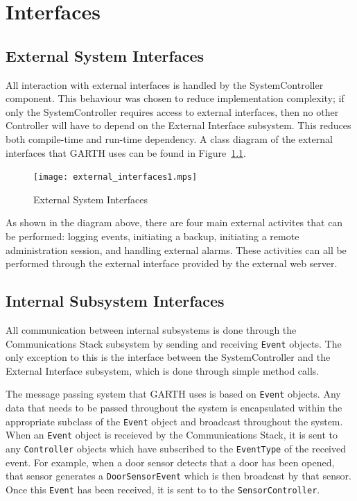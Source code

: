 \documentclass{report}
\begin{document}
\chapter{Interfaces} %
\label{ch:interfaces}

\section{External System Interfaces}

All interaction with external interfaces is handled by the
SystemController component. This behaviour was chosen to reduce
implementation complexity; if only the SystemController requires
access to external interfaces, then no other Controller will have to
depend on the External Interface subsystem.  This reduces both
compile-time and run-time dependency. A class diagram of the external
interfaces that GARTH uses can be found in
Figure~\ref{fig:external_interfaces}.

\begin{figure}[hp]
    \centering
        \caption{External System Interfaces}
        \scriptsize
        \setlength{\unitlength}{2.0em}
        \texttt{[image: external\_interfaces1.mps]}
        \normalsize
    \label{fig:external_interfaces}
\end{figure}

As shown in the diagram above, there are four main external activites
that can be performed: logging events, initiating a backup, initiating
a remote administration session, and handling external alarms. These
activities can all be performed through the external interface
provided by the external web server.

\section{Internal Subsystem Interfaces}

All communication between internal subsystems is done through the
Communications Stack subsystem by sending and receiving \texttt{Event}
objects. The only exception to this is the interface between the
SystemController and the External Interface subsystem, which is done
through simple method calls.

The message passing system that GARTH uses is based on \texttt{Event}
objects. Any data that needs to be passed throughout the system is
encapsulated within the appropriate subclass of the \texttt{Event}
object and broadcast throughout the system. When an \texttt{Event}
object is receieved by the Communications Stack, it is sent to any
\texttt{Controller} objects which have subscribed to the
\texttt{EventType} of the received event. For example, when a door
sensor detects that a door has been opened, that sensor generates a
\texttt{DoorSensorEvent} which is then broadcast by that sensor. Once
this \texttt{Event} has been received, it is sent to to the
\texttt{SensorController}.
\end{document}
